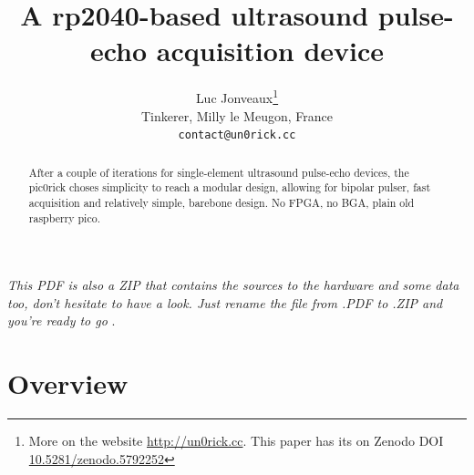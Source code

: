 \documentclass{article}
\title{A rp2040-based ultrasound pulse-echo acquisition device}
\author{
  Luc Jonveaux\thanks{More on the website \url{http://un0rick.cc}. This paper has its on Zenodo DOI  \href{http://doi.org/10.5281/zenodo.5792252}{10.5281/zenodo.5792252} } \\
  Tinkerer, Milly le Meugon, France\\
  \texttt{contact@un0rick.cc} \\
}
\begin{document}
\maketitle

\begin{abstract}
After a couple of iterations for single-element ultrasound pulse-echo devices, the pic0rick choses simplicity to reach a modular design, allowing for bipolar pulser, fast acquisition and relatively simple, barebone design. No FPGA, no BGA, plain old raspberry pico.

\end{abstract}


\emph{ This PDF is also a ZIP that contains the sources to the hardware and some data too, don't hesitate to have a look. Just rename the file from .PDF to .ZIP and you're ready to go }.








\section{Overview}
\end{document}
